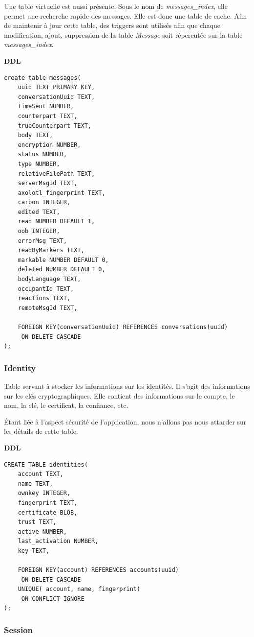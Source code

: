 \documentclass[a4paper,11pt]{article}
\begin{document}
Une table virtuelle est aussi présente. Sous le nom de \textit{messages\_index}, elle permet une recherche rapide des messages. Elle est donc une table de cache. Afin de maintenir à jour cette table, des triggers sont utilisés afin que chaque modification, ajout, suppression de la table \textit{Message} soit répercutée sur la table \textit{messages\_index}.

\textbf{DDL}
\begin{lstlisting}
create table messages(
    uuid TEXT PRIMARY KEY,
    conversationUuid TEXT,
    timeSent NUMBER,
    counterpart TEXT,
    trueCounterpart TEXT,
    body TEXT,
    encryption NUMBER,
    status NUMBER,
    type NUMBER,
    relativeFilePath TEXT,
    serverMsgId TEXT,
    axolotl_fingerprint TEXT,
    carbon INTEGER,
    edited TEXT,
    read NUMBER DEFAULT 1,
    oob INTEGER,
    errorMsg TEXT,
    readByMarkers TEXT,
    markable NUMBER DEFAULT 0,
    deleted NUMBER DEFAULT 0,
    bodyLanguage TEXT,
    occupantId TEXT,
    reactions TEXT,
    remoteMsgId TEXT, 
    
    FOREIGN KEY(conversationUuid) REFERENCES conversations(uuid) 
     ON DELETE CASCADE
);
\end{lstlisting}
\subsubsection*{Identity}

Table servant à stocker les informations sur les identités. Il s'agit des informations sur les clés cryptographiques. Elle contient des informations sur le compte, le nom, la clé, le certificat, la confiance, etc.

Étant liée à l'aspect sécurité de l'application, nous n'allons pas nous attarder sur les détails de cette table.

\textbf{DDL}
\begin{lstlisting}
CREATE TABLE identities(
    account TEXT,
    name TEXT,
    ownkey INTEGER,
    fingerprint TEXT,
    certificate BLOB,
    trust TEXT,
    active NUMBER,
    last_activation NUMBER,
    key TEXT,
    
    FOREIGN KEY(account) REFERENCES accounts(uuid)
     ON DELETE CASCADE
    UNIQUE( account, name, fingerprint)
     ON CONFLICT IGNORE
);
\end{lstlisting}
\subsubsection*{Session}
\end{document}
